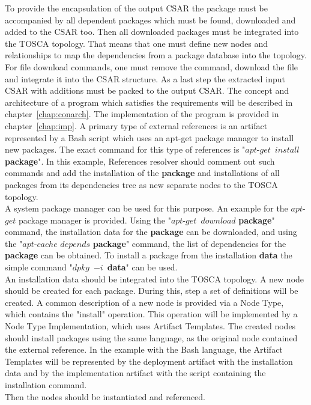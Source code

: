 To provide the encapsulation of the output CSAR the package must be accompanied by all dependent packages which must be found, downloaded and added to the CSAR too.
Then all downloaded packages must be integrated into the TOSCA topology.
That means that one must define new nodes and relationships to map the dependencies from a package database into the topology.
For file download commands, one must remove the command, download the file and integrate it into the CSAR structure.
As a last step the extracted input CSAR with additions must be packed to the output CSAR.
The concept and architecture of a program which satisfies the requirements will be described in chapter~\ref{chap:conarch}.
The implementation of the program is provided in chapter~\ref{chap:imp}.
A primary type of external references is an artifact represented by a Bash script which uses an apt-get package manager to install new packages.
The exact command for this type of references is "$apt$-$get$~$install$ \textbf{package}".
In this example, References resolver should comment out such commands and add the installation of the \textbf{package} and installations of all packages from its dependencies tree as new separate nodes to the TOSCA topology. \\
A system package manager can be used for this purpose. 
An example for the $apt$-$get$ package manager is provided. 
Using the "$apt$-$get$~$download$ \textbf{package}" command, the installation data for the \textbf{package} can be downloaded, and using the "$apt$-$cache$ $depends$ \textbf{package}" command, the list of dependencies for the \textbf{package} can be obtained. 
To install a package from the installation \textbf{data} the simple command "$dpkg$~$-i$~\textbf{data}" can be used.\\
An installation data should be integrated into the TOSCA topology. 
A new node should be created for each package. 
During this, step a set of definitions will be created.
A common description of a new node is provided via a Node Type, which contains the "install" operation. 
This operation will be implemented by a Node Type Implementation, which uses Artifact Templates.
The created nodes should install packages using the same language, as the original node contained the external reference.
In the example with the Bash language, the Artifact Templates will be represented by the deployment artifact with the installation data and by the implementation artifact with the script containing the installation command. \\
Then the nodes should be instantiated and referenced.

